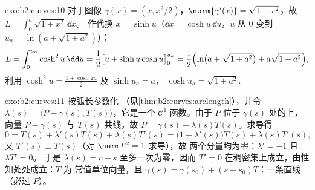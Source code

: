 \begin{solution}{exo:b2:curves:10}
对于图像 $\gamma(x) = (x, x^2/2)$，$\norm{\gamma'(x)} =
\sqrt{1 + x^2}$，故 $L = \int_0^a\sqrt{1+x^2}\,\dd x$。
作代换 $x = \sinh u$（$\dd x = \cosh u\,\dd u$，$u$ 从
$0$ 变到 $u_a = \ln(a + \sqrt{1+a^2})$）：
\[
L = \int_0^{u_a}\cosh^2 u\,\dd u
= \frac12\bigl[u + \sinh u\cosh u\bigr]_0^{u_a}
= \frac12\Bigl(\ln\bigl(a + \sqrt{1+a^2}\bigr) +
a\sqrt{1+a^2}\Bigr),
\]
利用 $\cosh^2 u = \frac{1 + \cosh 2u}2$ 及 $\sinh u_a = a$，
$\cosh u_a = \sqrt{1 + a^2}$.
\end{solution}

\begin{solution}{exo:b2:curves:11}
按弧长参数化
（见\cref{thm:b2:curves:arclength}），并令 $\lambda(s) =
\langle P - \gamma(s), T(s)\rangle$，它是一个 $\mathcal C^1$
函数。由于 $P$ 位于 $\gamma(s)$ 处的上，
向量 $P - \gamma(s)$ 与 $T(s)$ 共线，故 $P =
\gamma(s) + \lambda(s)T(s)$。求导得
\[
0 = T(s) + \lambda'(s)T(s) + \lambda(s)T'(s)
= \bigl(1 + \lambda'(s)\bigr)T(s) + \lambda(s)T'(s),
\]
又 $T'(s) \perp T(s)$（对 $\norm T^2 = 1$ 求导），故
两个分量均为零：$\lambda' = -1$ 且 $\lambda T' = 0$。
于是 $\lambda(s) = c - s$ 至多一次为零，因而 $T' = 0$
在稠密集上成立，由性知处处成立：$T$ 为
常值单位向量，且 $\gamma(s) = \gamma(s_0) + (s -
s_0)T$：一条直线（必过 $P$）。
\end{solution}

